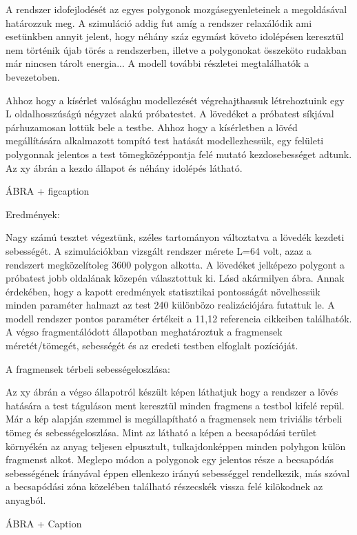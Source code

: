 A rendszer idofejlodését az egyes polygonok mozgásegyenleteinek a megoldásával határozzuk meg. A szimuláció addig fut amíg a rendszer relaxálódik
ami esetünkben annyit jelent, hogy néhány száz egymást követo idolépésen keresztül nem történik újab törés a rendszerben, illetve a
polygonokat összeköto rudakban már nincsen tárolt energia... A modell további részletei megtalálhatók a bevezetoben.

Ahhoz hogy a kísérlet valósághu modellezését végrehajthassuk létrehoztuink egy L oldalhosszúságú négyzet alakú próbatestet. A lövedéket
a próbatest síkjával párhuzamosan lottük bele a testbe. Ahhoz hogy a kísérletben a lövéd megállítására alkalmazott tompító test hatását
modellezhessük, egy felületi polygonnak jelentos a test tömegközéppontja felé mutató kezdosebességet adtunk. Az xy ábrán a kezdo állapot
és néhány idolépés látható. 

ÁBRA + figcaption

Eredmények:

Nagy számú tesztet végeztünk, széles tartományon változtatva a lövedék kezdeti sebességét. A szimulációkban vizsgált rendszer mérete 
L=64 volt, azaz a rendszert megközelítoleg 3600 polygon alkotta. A lövedéket jelképezo polygont a próbatest jobb oldalának közepén választottuk 
ki. Lásd akármilyen ábra.
Annak érdekében, hogy a kapott eredmények statisztikai pontosságát növelhessük minden paraméter halmazt az test 240 különbözo realizációjára futattuk 
le. A modell rendszer pontos paraméter értékeit a 11,12 referencia cikkeiben találhatók. A végso fragmentálódott állapotban meghatároztuk a fragmensek 
méretét/tömegét, sebességét és az eredeti testben elfoglalt pozícióját.

A fragmensek térbeli sebességeloszlása:

Az xy ábrán a végso állapotról készült képen láthatjuk hogy a rendszer a lövés hatására a test táguláson ment keresztül minden fragmens a testbol 
kifelé repül. Már a kép alapján szemmel is megállapítható a fragmensek nem triviális térbeli tömeg és sebességeloszlása. Mint az látható a képen
a becsapódási terület környékén az anyag teljesen elpusztult, tulkajdonképpen minden polyhgon külön fragmenst alkot. Meglepo módon a polygonok egy
jelentos része a becsapódás sebességének írányával éppen ellenkezo irányú sebességgel rendelkezik, más szóval a becsapódási zóna közelében 
található részecskék vissza felé kilökodnek az anyagból.

ÁBRA + Caption

